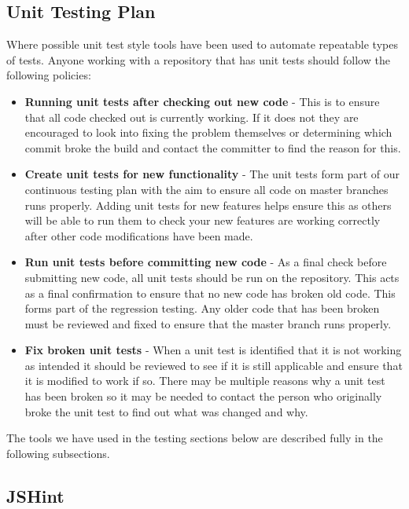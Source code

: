 \subsection{Unit Testing Plan}
\label{Section:Testing_unittesting}

Where possible unit test style tools have been used to automate repeatable types of tests. Anyone working with a repository that has unit tests should follow the following policies:

\begin{itemize}
\item \textbf{Running unit tests after checking out new code} - This is to ensure that all code checked out is currently working. If it does not they are encouraged to look into fixing the problem themselves or determining which commit broke the build and contact the committer to find the reason for this.

\item \textbf{Create unit tests for new functionality} - The unit tests form part of our continuous testing plan with the aim to ensure all code on master branches runs properly. Adding unit tests for new features helps ensure this as others will be able to run them to check your new features are working correctly after other code modifications have been made.

\item \textbf{Run unit tests before committing new code} - As a final check before submitting new code, all unit tests should be run on the repository. This acts as a final confirmation to ensure that no new code has broken old code. This forms part of the regression testing. Any older code that has been broken must be reviewed and fixed to ensure that the master branch runs properly.

\item \textbf{Fix broken unit tests} - When a unit test is identified that it is not working as intended it should be reviewed to see if it is still applicable and ensure that it is modified to work if so. There may be multiple reasons why a unit test has been broken so it may be needed to contact the person who originally broke the unit test to find out what was changed and why.
\end{itemize}

The tools we have used in the testing sections below are described fully in the following subsections.

\subsection{JSHint}

